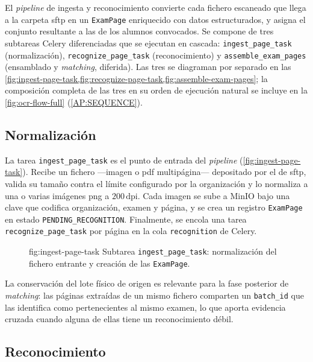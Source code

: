 El \textit{pipeline} de ingesta y reconocimiento convierte cada fichero
escaneado que llega a la carpeta \acs{sftp} en un \texttt{ExamPage}
enriquecido con datos estructurados, y asigna el conjunto resultante a
las  de los alumnos convocados. Se compone de tres
subtareas Celery diferenciadas que se ejecutan en cascada:
\texttt{ingest\_page\_task} (normalización),
\texttt{recognize\_page\_task} (reconocimiento) y
\texttt{assemble\_exam\_pages} (ensamblado y \textit{matching},
diferida). Las tres se diagraman por separado en las
\cref{fig:ingest-page-task,fig:recognize-page-task,fig:assemble-exam-pages};
la composición completa de las tres en su orden de ejecución natural se
incluye en la \cref{fig:ocr-flow-full} (\cref{AP:SEQUENCE}).


\subsection{Normalización}
\label{SS:DES-INGEST-PROCESSING}

La tarea \texttt{ingest\_page\_task} es el punto de entrada del
\textit{pipeline} (\cref{fig:ingest-page-task}). Recibe un fichero
—imagen o \acs{pdf} multipágina— depositado por el  de
\acs{sftp}, valida su tamaño contra el límite configurado por la
organización y lo normaliza a una o varias imágenes png a
\(200\,\text{dpi}\). Cada imagen se sube a MinIO bajo una clave que
codifica organización, examen y página, y se crea un registro
\texttt{ExamPage} en estado \texttt{PENDING\_RECOGNITION}. Finalmente, se
encola una tarea \texttt{recognize\_page\_task} por página en la cola
\texttt{recognition} de Celery.

\begin{figure}[Subtarea de normalización]%
              {fig:ingest-page-task}%
              {Subtarea \texttt{ingest\_page\_task}: normalización del
               fichero entrante y creación de las \texttt{ExamPage}.}
\end{figure}

La conservación del lote físico de origen es relevante para la fase
posterior de \textit{matching}: las páginas extraídas de un mismo
fichero comparten un \texttt{batch\_id} que las identifica como
pertenecientes al mismo examen, lo que aporta evidencia cruzada cuando
alguna de ellas tiene un reconocimiento débil.


\subsection{Reconocimiento}
\label{SS:DES-INGEST-RECOGNITION}

